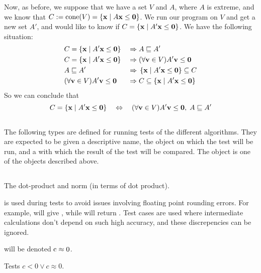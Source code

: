 Now, as before, we suppose that we have a set $V$ and $A$, where $A$ is extreme, and we know that $C := \operatorname{cone}(V) = \left\{\mathbf{x}\;|\; A\mathbf{x}\leq\mathbf{0}\right\}$.  We run our program on $V$ and get a new set $A'$, and would like to know if $C = \left\{\mathbf{x}\;|\; A'\mathbf{x}\leq\mathbf{0}\right\}$.  We have the following situation:
\begin{alignat*}{2}
  &C = \left\{\mathbf{x}\;|\; A'\mathbf{x}\leq\mathbf{0}\right\}    \;&\Rightarrow&\; A \sqsubseteq A' \\
  &C = \left\{\mathbf{x}\;|\; A'\mathbf{x}\leq\mathbf{0}\right\}    \;&\Rightarrow&\; (\forall \mathbf{v}\in V) A'\mathbf{v} \leq \mathbf{0} \\
  &A \sqsubseteq A' \;&\Rightarrow&\; \left\{\mathbf{x}\;|\; A'\mathbf{x}\leq\mathbf{0}\right\} \subseteq C \\
  &(\forall \mathbf{v}\in V) A'\mathbf{v} \leq \mathbf{0}  \;&\Rightarrow&\; C \subseteq \left\{\mathbf{x}\;|\; A'\mathbf{x}\leq\mathbf{0}\right\} 
\end{alignat*}
So we can conclude that
\[ C = \left\{\mathbf{x}\;|\; A'\mathbf{x}\leq\mathbf{0}\right\} \quad\Leftrightarrow\quad 
   (\forall \mathbf{v}\in V)A'\mathbf{v}\leq\mathbf{0},\; A \sqsubseteq A' \]

\subsection{}

The following types are defined for running tests of the different algorithms.  They are expected to be given a descriptive name, the object on which the test will be run, and a  with which the result of the test will be compared.  The  object is one of the objects described above.
\lsthconetestcasea
\lstvconetestcasea
\lsthpolytestcaseb
\lstvpolytestcaseb

\subsection{}

The dot-product and norm (in terms of dot product).
\lstoperator
\lstnorm

 is used during tests to avoid issues involving floating point rounding errors.  For example,  will give , while  will return .  Test cases are used where intermediate calculations don't depend on such high accuracy, and these discrepencies can be ignored.

 will be denoted $\mli{c} \approx 0$.
\lstapproximatelyzeroa

Tests $c < 0 \lor c \approx 0$.
\lstapproximatelyltzero

